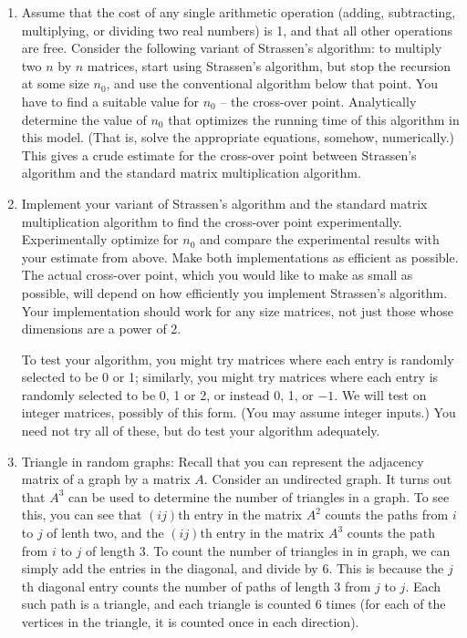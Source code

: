 \documentclass[11pt]{article}
\begin{document}

\begin{enumerate}

\item Assume that the cost of any single arithmetic operation (adding,
subtracting, multiplying, or dividing two real numbers) is 1, and that
all other operations are free.  Consider the following variant of
Strassen's algorithm: to multiply two $n$ by $n$ matrices, start using
Strassen's algorithm, but stop the recursion at some size $n_0$, and
use the conventional algorithm below that point.  You have to find a
suitable value for $n_0$ -- the cross-over point.  Analytically
determine the value of $n_0$ that optimizes the running time of this
algorithm in this model.  (That is, solve the appropriate equations, somehow,
numerically.)
This gives a crude estimate for the cross-over point between
Strassen's algorithm and the standard matrix multiplication algorithm.
\item Implement your variant of Strassen's algorithm and the standard
matrix multiplication algorithm to find the cross-over point
experimentally.  Experimentally optimize for $n_0$ and compare the
experimental results with your estimate from above.  Make both
implementations as efficient as possible.  The actual cross-over
point, which you would like to make as small as possible, will depend
on how efficiently you implement Strassen's algorithm.  Your implementation
should work for any size matrices, not just those whose dimensions are a power
of 2.

To test your algorithm, you might try matrices where each entry is
randomly selected to be 0 or 1; similarly, you might try matrices
where each entry is randomly selected to be 0, 1 or 2, or instead 0,
1, or $-1$.  We will test on integer matrices, possibly of this form.
(You may assume integer inputs.)  You need not try all of these, but
do test your algorithm adequately.

\item Triangle in random graphs:  Recall that you can represent the
adjacency matrix of a graph by a matrix $A$.  Consider an undirected
graph.  It turns out that $A^3$ can be used to determine the number
of triangles in a graph.  To see this, you can see that $(ij)$th entry
in the matrix $A^2$ counts the paths from $i$ to $j$ of lenth two,
and the $(ij)$th entry in the matrix $A^3$ counts the path from $i$ to
$j$ of length 3.  To count the number of triangles in in graph, we can
simply add the entries in the diagonal, and divide by 6.  This is because
the $j$th diagonal entry counts the number of paths of length 3 from $j$
to $j$.  Each such path is a triangle, and each triangle is counted 6 times
(for each of the vertices in the triangle, it is counted once in each direction).  


\end{enumerate}
\end{document}
